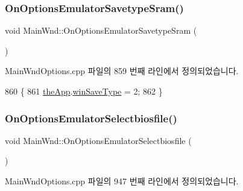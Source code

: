 \subsubsection{\texorpdfstring{On\+Options\+Emulator\+Savetype\+Sram()}{OnOptionsEmulatorSavetypeSram()}}
{\footnotesize\ttfamily void Main\+Wnd\+::\+On\+Options\+Emulator\+Savetype\+Sram (\begin{DoxyParamCaption}{ }\end{DoxyParamCaption})\hspace{0.3cm}{\ttfamily [protected]}}



Main\+Wnd\+Options.\+cpp 파일의 859 번째 라인에서 정의되었습니다.


\begin{DoxyCode}
860 \{
861   \mbox{\hyperlink{_v_b_a_8cpp_a8095a9d06b37a7efe3723f3218ad8fb3}{theApp}}.\mbox{\hyperlink{class_v_b_a_a70060f88010280739406c87ef66d036a}{winSaveType}} = 2;
862 \}
\end{DoxyCode}
\mbox{\label{class_main_wnd_a7a3ee694ccb8d2fd21066b71d93cef22}} 
\subsubsection{\texorpdfstring{On\+Options\+Emulator\+Selectbiosfile()}{OnOptionsEmulatorSelectbiosfile()}}
{\footnotesize\ttfamily void Main\+Wnd\+::\+On\+Options\+Emulator\+Selectbiosfile (\begin{DoxyParamCaption}{ }\end{DoxyParamCaption})\hspace{0.3cm}{\ttfamily [protected]}}



Main\+Wnd\+Options.\+cpp 파일의 947 번째 라인에서 정의되었습니다.


